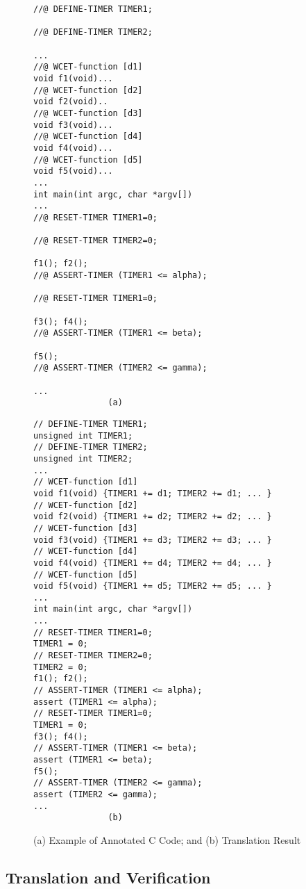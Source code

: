 \documentclass{llncs}
\begin{document}
\begin{figure}[!htb]
\center
\begin{minipage}[b]{.45\textwidth}
\label{code:annotation-and-translation1}
{\scriptsize
\begin{verbatim}
//@ DEFINE-TIMER TIMER1;

//@ DEFINE-TIMER TIMER2;

...
//@ WCET-function [d1]
void f1(void)...
//@ WCET-function [d2]
void f2(void)..
//@ WCET-function [d3]
void f3(void)...
//@ WCET-function [d4]
void f4(void)...
//@ WCET-function [d5]
void f5(void)...
...
int main(int argc, char *argv[])
...
//@ RESET-TIMER TIMER1=0;

//@ RESET-TIMER TIMER2=0;

f1(); f2();
//@ ASSERT-TIMER (TIMER1 <= alpha);

//@ RESET-TIMER TIMER1=0;

f3(); f4();
//@ ASSERT-TIMER (TIMER1 <= beta);

f5();
//@ ASSERT-TIMER (TIMER2 <= gamma);

...
               (a)
\end{verbatim}
}
\end{minipage}
\hfill
\begin{minipage}[b]{.53\textwidth}
{\scriptsize
\begin{verbatim}
// DEFINE-TIMER TIMER1;
unsigned int TIMER1;
// DEFINE-TIMER TIMER2;
unsigned int TIMER2;
...
// WCET-function [d1]
void f1(void) {TIMER1 += d1; TIMER2 += d1; ... } 
// WCET-function [d2]
void f2(void) {TIMER1 += d2; TIMER2 += d2; ... }
// WCET-function [d3]
void f3(void) {TIMER1 += d3; TIMER2 += d3; ... }
// WCET-function [d4]
void f4(void) {TIMER1 += d4; TIMER2 += d4; ... }
// WCET-function [d5]
void f5(void) {TIMER1 += d5; TIMER2 += d5; ... }
...
int main(int argc, char *argv[])
...
// RESET-TIMER TIMER1=0;
TIMER1 = 0;
// RESET-TIMER TIMER2=0;
TIMER2 = 0;
f1(); f2();
// ASSERT-TIMER (TIMER1 <= alpha);
assert (TIMER1 <= alpha);
// RESET-TIMER TIMER1=0;
TIMER1 = 0;
f3(); f4();
// ASSERT-TIMER (TIMER1 <= beta);
assert (TIMER1 <= beta);
f5();
// ASSERT-TIMER (TIMER2 <= gamma);
assert (TIMER2 <= gamma);
...
               (b)
\end{verbatim}
}
\end{minipage}
\label{code:annotation-and-translation}
\caption{(a) Example of Annotated C Code; and (b) Translation Result}
\end{figure}



\subsection{Translation and Verification}
\end{document}

